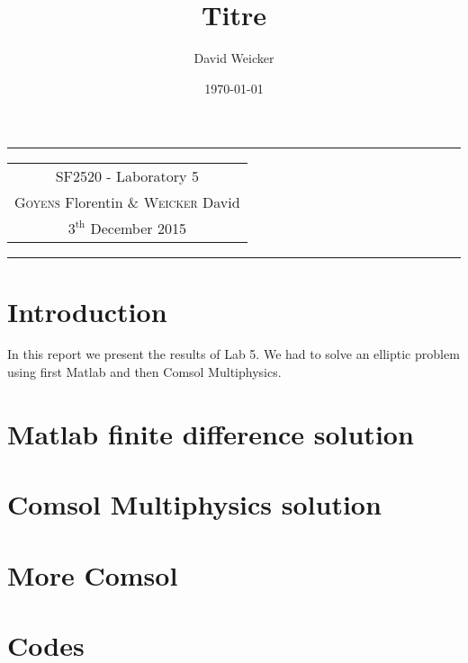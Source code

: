 \documentclass[11pt,a4paper]{article}
\title{Titre}
\author{David Weicker}
\date{\today}
\begin{document}
\tabulinesep=1.2mm
\begin{center}
\hrule
\begin{tabular}{c}
\\[0.005cm]
\Large{SF2520 - Laboratory 5}\\[0.3cm] %
\textsc{Goyens} Florentin  \& \textsc{Weicker} David \\[0.2cm]
$\text{3}^{\text{th}}$ December 2015\\[0.2cm] %
\end{tabular}
\hrule
\end{center}

\section*{Introduction}

In this report we present the results of Lab 5. We had to solve an elliptic problem using first Matlab and then Comsol Multiphysics.


\section{Matlab finite difference solution}


 
\section{Comsol Multiphysics solution}



\section{More Comsol}



\section*{Codes}

\end{document}
